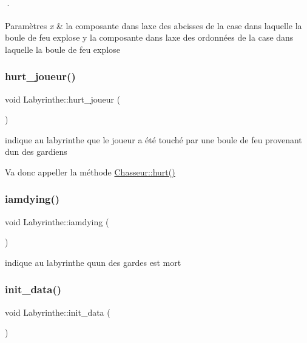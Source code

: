 ·
\begin{DoxyParams}{Paramètres}
{\em x} & la composante dans l\textquotesingle{}axe des abcisses de la case dans laquelle la boule de feu explose  y la composante dans l\textquotesingle{}axe des ordonnées de la case dans laquelle la boule de feu explose \\
\hline
\end{DoxyParams}
\mbox{\label{classLabyrinthe_a28666f6cd5a5f32d41d664204a717593}} 
\subsubsection{\texorpdfstring{hurt\+\_\+joueur()}{hurt\_joueur()}}
{\footnotesize\ttfamily void Labyrinthe\+::hurt\+\_\+joueur (\begin{DoxyParamCaption}{ }\end{DoxyParamCaption})}



indique au labyrinthe que le joueur a été touché par une boule de feu provenant d\textquotesingle{}un des gardiens 

Va donc appeller la méthode \hyperlink{classChasseur_ac75a09254dea5b1d25c7dbf49809a273}{Chasseur\+::hurt()} \mbox{\label{classLabyrinthe_a987dc5663797cae6f75853e24a9f3ffb}} 
\subsubsection{\texorpdfstring{iamdying()}{iamdying()}}
{\footnotesize\ttfamily void Labyrinthe\+::iamdying (\begin{DoxyParamCaption}{ }\end{DoxyParamCaption})\hspace{0.3cm}{\ttfamily [inline]}}



indique au labyrinthe qu\textquotesingle{}un des gardes est mort 

\mbox{\label{classLabyrinthe_afc3f86c4ce00a37bd2b033d1e343c7c5}} 
\subsubsection{\texorpdfstring{init\+\_\+data()}{init\_data()}}
{\footnotesize\ttfamily void Labyrinthe\+::init\+\_\+data (\begin{DoxyParamCaption}{ }\end{DoxyParamCaption})\hspace{0.3cm}{\ttfamily [private]}}



